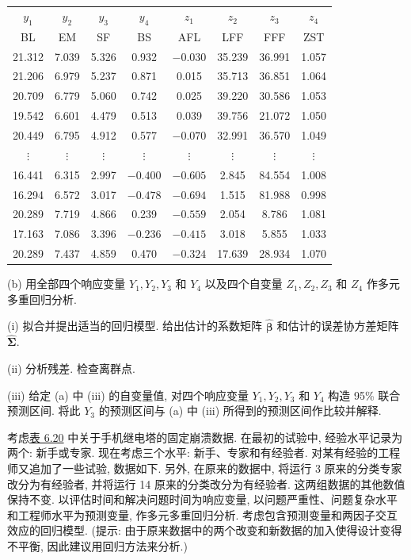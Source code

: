 
\begin{mvtable}
\label{tab:7.7}
\footnotesize
\begin{tabular}{cccccccc}
\toprule
$y_1$&$y_2$&$y_3$&$y_4$&$z_1$&$z_2$&$z_3$&$z_4$\\
BL&EM&SF&BS&AFL&LFF&FFF&ZST\\
\midrule
21.312&7.039&5.326&0.932&$-0.030$&35.239&36.991&1.057\\
21.206&6.979&5.237&0.871&0.015&35.713&36.851&1.064\\
20.709&6.779&5.060&0.742&0.025&39.220&30.586&1.053\\
19.542&6.601&4.479&0.513&0.039&39.756&21.072&1.050\\
20.449&6.795&4.912&0.577&$-0.070$&32.991&36.570&1.049\\
$\vdots$&$\vdots$&$\vdots$&$\vdots$&$\vdots$&$\vdots$&$\vdots$&$\vdots$\\
16.441&6.315&2.997&$-0.400$&$-0.605$&2.845&84.554&1.008\\
16.294&6.572&3.017&$-0.478$&$-0.694$&1.515&81.988&0.998\\
20.289&7.719&4.866&0.239&$-0.559$&2.054&8.786&1.081\\
17.163&7.086&3.396&$-0.236$&$-0.415$&3.018&5.855&1.033\\
20.289&7.437&4.859&0.470&$-0.324$&17.639&28.934&1.070\\
\bottomrule
\end{tabular}
\end{mvtable}


\medskip
\noindent (b) 用全部四个响应变量 $Y_1,Y_2,Y_3$ 和 $Y_4$ 以及四个自变量 $Z_1,Z_2,Z_3$ 和 $Z_4$ 作多元多重回归分析.

\noindent (i) 拟合并提出适当的回归模型. 给出估计的系数矩阵 $\hat{\boldsymbol{\beta}}$ 和估计的误差协方差矩阵 $\hat{\boldsymbol{\Sigma}}$.

\noindent (ii) 分析残差. 检查离群点.

\noindent (iii) 给定 (a) 中 (iii) 的自变量值, 对四个响应变量 $Y_1,Y_2,Y_3$ 和 $Y_4$ 构造 95\% 联合预测区间. 将此 $Y_3$ 的预测区间与 (a) 中 (iii) 所得到的预测区间作比较并解释.

\medskip
{}\quad 考虑\hyperref[tab:6.20]{表 6.20} 中关于手机继电塔的固定崩溃数据. 在最初的试验中, 经验水平记录为两个: 新手或专家. 现在考虑三个水平: 新手、专家和有经验者. 对某有经验的工程师又追加了一些试验, 数据如下. 另外, 在原来的数据中, 将运行 3 原来的分类专家改分为有经验者, 并将运行 14 原来的分类改分为有经验者. 这两组数据的其他数值保持不变. 以评估时间和解决问题时间为响应变量, 以问题严重性、问题复杂水平和工程师水平为预测变量, 作多元多重回归分析. 考虑包含预测变量和两因子交互效应的回归模型. (提示: 由于原来数据中的两个改变和新数据的加入使得设计变得不平衡, 因此建议用回归方法来分析.)

